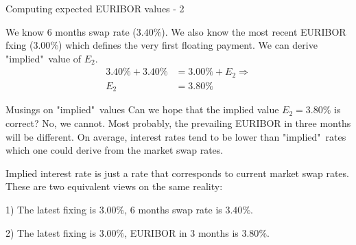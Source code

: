 \documentclass{beamer}
\begin{document}
\begin{frame}{Computing expected EURIBOR values - 2}
\centering
{}

\justify
We know 6 months swap rate ($3.40\%$). We also know the most recent EURIBOR fxing ($3.00\%$) which defines the very first floating payment. We can derive "implied"\ value of $E_2$.
\begin{align*}
3.40\% + 3.40\% &= 3.00\% + E_2 \Rightarrow \\
E_2 &= 3.80\%
\end{align*}

\end{frame}



\begin{frame}{Musings on "implied"\ values}
\justify
Can we hope that the implied value $E_2=3.80\%$ is correct? No, we cannot. Most probably, the prevailing EURIBOR in three months will be different. On average, interest rates tend to be lower than "implied"\ rates which one could derive from the market swap rates.

\justify
Implied interest rate is just a rate that corresponds to current market swap rates. These are two equivalent views on the same reality:

1) The latest fixing is $3.00\%$, 6 months swap rate is $3.40\%$.

2) The latest fixing is $3.00\%$, EURIBOR in 3 months is $3.80\%$.
\end{frame}
\end{document}
